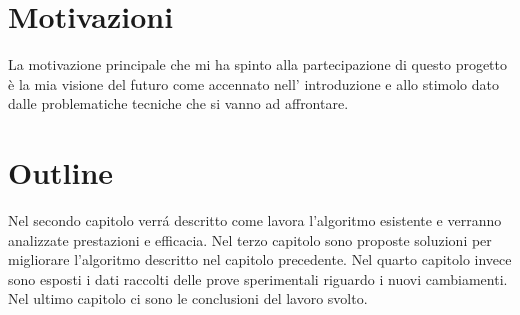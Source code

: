 \section{Motivazioni}
	La motivazione principale che mi ha spinto alla partecipazione di questo progetto è la mia visione del futuro come accennato nell' introduzione e allo stimolo dato dalle problematiche tecniche che si vanno ad affrontare.

\section{Outline}
	Nel secondo capitolo verr\'a descritto come lavora l'algoritmo esistente e verranno analizzate prestazioni e efficacia.
	Nel terzo capitolo sono proposte soluzioni per migliorare l'algoritmo descritto nel capitolo precedente.
	Nel quarto  capitolo invece sono esposti i dati raccolti delle prove sperimentali riguardo i nuovi cambiamenti. Nel ultimo capitolo ci sono le conclusioni del lavoro svolto.

















